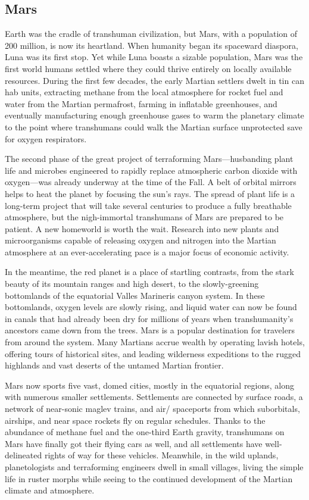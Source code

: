 \subsection{Mars}

Earth was the cradle of transhuman civilization, 
but Mars, with a population of 200 million, is now 
its heartland. When humanity began its spaceward 
diaspora, Luna was its first stop. Yet while Luna 
boasts a sizable population, Mars was the first world 
humans settled where they could thrive entirely 
on locally available resources. During the first few 
decades, the early Martian settlers dwelt in tin can 
hab units, extracting methane from the local atmosphere
for rocket fuel and water from the Martian
permafrost, farming in inflatable greenhouses, and 
eventually manufacturing enough greenhouse gases 
to warm the planetary climate to the point where 
transhumans could walk the Martian surface unprotected
save for oxygen respirators.

The second phase of the great project of terraforming
Mars—husbanding plant life and microbes engineered
to rapidly replace atmospheric carbon dioxide
with oxygen—was already underway at the time of 
the Fall. A belt of orbital mirrors helps to heat the 
planet by focusing the sun's rays. The spread of plant 
life is a long-term project that will take several centuries
to produce a fully breathable atmosphere, but
the nigh-immortal transhumans of Mars are prepared 
to be patient. A new homeworld is worth the wait. 
Research into new plants and microorganisms capable 
of releasing oxygen and nitrogen into the Martian atmosphere
at an ever-accelerating pace is a major focus
of economic activity.

In the meantime, the red planet is a place of startling
contrasts, from the stark beauty of its mountain
ranges and high desert, to the slowly-greening bottomlands
of the equatorial Valles Marineris canyon
system. In these bottomlands, oxygen levels are 
slowly rising, and liquid water can now be found in 
canals that had already been dry for millions of years 
when transhumanity's ancestors came down from 
the trees. Mars is a popular destination for travelers
from around the system. Many Martians accrue
wealth by operating lavish hotels, offering tours of 
historical sites, and leading wilderness expeditions to 
the rugged highlands and vast deserts of the untamed 
Martian frontier.

Mars now sports five vast, domed cities, mostly in 
the equatorial regions, along with numerous smaller 
settlements. Settlements are connected by surface 
roads, a network of near-sonic maglev trains, and air/
spaceports from which suborbitals, airships, and near 
space rockets fly on regular schedules. Thanks to the 
abundance of methane fuel and the one-third Earth 
gravity, transhumans on Mars have finally got their 
flying cars as well, and all settlements have well-delineated
rights of way for these vehicles. Meanwhile,
in the wild uplands, planetologists and terraforming 
engineers dwell in small villages, living the simple life 
in ruster morphs while seeing to the continued development
of the Martian climate and atmosphere.

